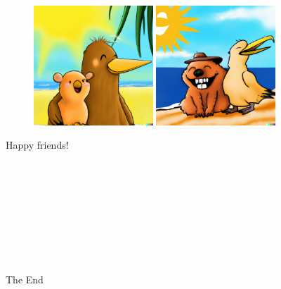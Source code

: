 \documentclass{article}
\newcommand{\imagewidthfactor}{0.4}
\begin{document}
\begin{figure}[h!]
\vspace{1.1em}
\includegraphics[width=\imagewidthfactor\textwidth]{media/9c.png}
\quad
\includegraphics[width=\imagewidthfactor\textwidth]{media/9d.png}
\end{figure}

\centering
Happy friends!

\newpage %

\centering
\Huge
\mbox{}\\\mbox{}\\\mbox{}\\\mbox{}\\\mbox{}\\\mbox{}\\\mbox{}\\\mbox{}\\
The End
\end{document}
